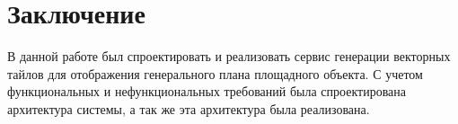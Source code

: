 \section*{\Large{Заключение}}
В данной работе был спроектировать и реализовать сервис генерации векторных тайлов
для отображения генерального плана площадного объекта.
С учетом функциональных и нефункциональных требований была спроектирована архитектура системы,
а так же эта архитектура была реализована.
